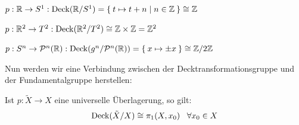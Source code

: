 \begin{beispiel}
    \begin{bspenum}
        \item $p: \mathbb{R} \rightarrow S^1: \operatorname{Deck}(\mathbb{R} / S^1) = \Set{t \mapsto t + n | n \in \ensuremath{\mathbb{Z}}} \cong \mathbb{Z}$
        \item $p: \mathbb{R}^2 \rightarrow T^2: \operatorname{Deck}(\mathbb{R}^2 / T^2) \cong \mathbb{Z} \times \mathbb{Z} = \mathbb{Z}^2$
        \item $p: S^n \rightarrow \mathcal{P}^n(\mathbb{R}): \operatorname{Deck}(g^n / \mathcal{P}^n(\mathbb{R})) = \Set{x \mapsto \pm x} \cong \mathbb{Z} / 2 \mathbb{Z}$
    \end{bspenum}
\end{beispiel}

Nun werden wir eine Verbindung zwischen der Decktransformationsgruppe
und der Fundamentalgruppe herstellen:

\begin{satz}\label{thm:12.15}%
    Ist $p: \tilde{X} \rightarrow X$ eine universelle Überlagerung, 
    so gilt:
    \[\operatorname{Deck}(\tilde{X}/X) \cong \pi_1(X, x_0)\;\;\;\forall x_0 \in X\]
\end{satz}

